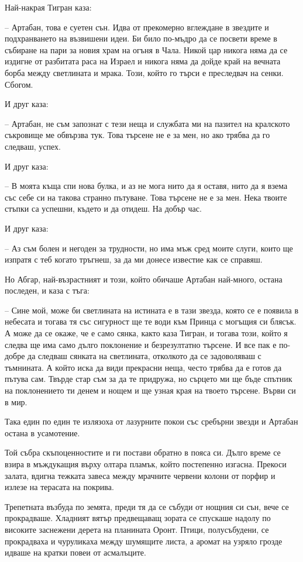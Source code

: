 Най-накрая Тигран каза:

-- Артабан, това е суетен сън. Идва от прекомерно вглеждане в звездите и
подхранването на възвишени идеи. Би било по-мъдро да се посвети време в събиране
на пари за новия храм на огъня в Чала. Никой цар никога няма да се издигне от
разбитата раса на Израел и никога няма да дойде край на вечната борба между
светлината и мрака. Този, който го търси е преследвач на сенки. Сбогом.

И друг каза:

-- Артабан, не съм запознат с тези неща и службата ми на пазител на кралското
съкровище ме обвързва тук. Това търсене не е за мен, но ако трябва да го
следваш, успех.

И друг каза:

-- В моята къща спи нова булка, и аз не мога нито да я оставя, нито да я взема
със себе си на такова странно пътуване. Това търсене не е за мен. Нека твоите
стъпки са успешни, където и да отидеш. На добър час.

И друг каза:

-- Аз съм болен и негоден за трудности, но има мъж сред моите слуги, които ще
изпратя с теб когато тръгнеш, за да ми донесе известие как се справяш.

Но Абгар, най-възрастният и този, който обичаше Артабан най-много, остана
последен, и каза с тъга:

-- Сине мой, може би светлината на истината е в тази звезда, която се е появила
в небесата и тогава тя със сигурност ще те води към Принца с могъщия си блясък.
А може да се окаже, че е само сянка, както каза Тигран, и тогава този, който я
следва ще има само дълго поклонение и безрезултатно търсене. И все пак е
по-добре да следваш сянката на светлината, отколкото да се задоволяваш с
тъмнината. А който иска да види прекрасни неща, често трябва да е готов да
пътува сам. Твърде стар съм за да те придружа, но сърцето ми ще бъде спътник на
поклонението ти денем и нощем и ще узная края на твоето търсене. Върви си в мир.

Така един по един те излязоха от лазурните покои със сребърни звезди и Артабан
остана в усамотение.

Той събра скъпоценностите и ги постави обратно в пояса си. Дълго време се взира
в мъждукащия върху олтара пламък, който постепенно изгасна. Прекоси залата,
вдигна тежката завеса между мрачните червени колони от порфир и излезе на
терасата на покрива.

Трепетната възбуда по земята, преди тя да се събуди от нощния си сън, вече се
прокрадваше. Хладният вятър предвещаващ зората се спускаше надолу по високите
заснежени дерета на планината Оронт. Птици, полусъбудени, се прокрадваха и
чуруликаха между шумящите листа, а аромат на узряло грозде идваше на кратки
повеи от асмалъците.

